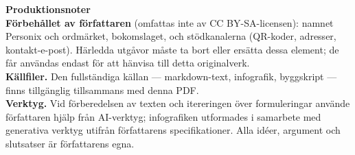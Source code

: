 \clearpage
\thispagestyle{empty}
\begin{flushleft}\small\sffamily
\textbf{Produktionsnoter}\\[1.2em]

\textbf{Förbehållet av författaren} (omfattas inte av CC BY-SA-licensen):
namnet Personix och ordmärket, bokomslaget, och stödkanalerna (QR-koder,
adresser, kontakt-e-post). Härledda utgåvor måste ta bort eller ersätta
dessa element; de får användas endast för att hänvisa till detta originalverk.\\[1.2em]

\textbf{Källfiler.} Den fullständiga källan --- markdown-text, infografik,
byggskript --- finns tillgänglig tillsammans med denna PDF.\\[1.2em]

\textbf{Verktyg.} Vid förberedelsen av texten och itereringen över formuleringar
använde författaren hjälp från AI-verktyg; infografiken utformades i samarbete
med generativa verktyg utifrån författarens specifikationer. Alla idéer,
argument och slutsatser är författarens egna.
\end{flushleft}
\clearpage
